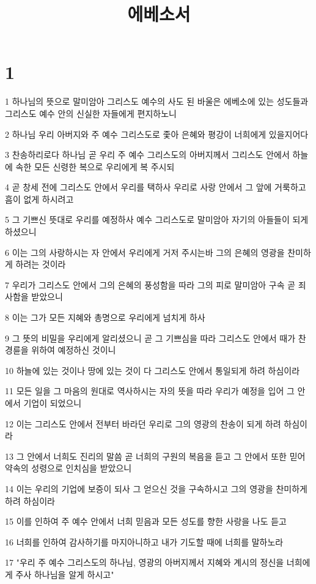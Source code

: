 

\title{에베소서}


\chapter{1}

\par 1 하나님의 뜻으로 말미암아 그리스도 예수의 사도 된 바울은 에베소에 있는 성도들과 그리스도 예수 안의 신실한 자들에게 편지하노니
\par 2 하나님 우리 아버지와 주 예수 그리스도로 좇아 은혜와 평강이 너희에게 있을지어다
\par 3 찬송하리로다 하나님 곧 우리 주 예수 그리스도의 아버지께서 그리스도 안에서 하늘에 속한 모든 신령한 복으로 우리에게 복 주시되
\par 4 곧 창세 전에 그리스도 안에서 우리를 택하사 우리로 사랑 안에서 그 앞에 거룩하고 흠이 없게 하시려고
\par 5 그 기쁘신 뜻대로 우리를 예정하사 예수 그리스도로 말미암아 자기의 아들들이 되게 하셨으니
\par 6 이는 그의 사랑하시는 자 안에서 우리에게 거저 주시는바 그의 은혜의 영광을 찬미하게 하려는 것이라
\par 7 우리가 그리스도 안에서 그의 은혜의 풍성함을 따라 그의 피로 말미암아 구속 곧 죄 사함을 받았으니
\par 8 이는 그가 모든 지혜와 총명으로 우리에게 넘치게 하사
\par 9 그 뜻의 비밀을 우리에게 알리셨으니 곧 그 기쁘심을 따라 그리스도 안에서 때가 찬 경륜을 위하여 예정하신 것이니
\par 10 하늘에 있는 것이나 땅에 있는 것이 다 그리스도 안에서 통일되게 하려 하심이라
\par 11 모든 일을 그 마음의 원대로 역사하시는 자의 뜻을 따라 우리가 예정을 입어 그 안에서 기업이 되었으니
\par 12 이는 그리스도 안에서 전부터 바라던 우리로 그의 영광의 찬송이 되게 하려 하심이라
\par 13 그 안에서 너희도 진리의 말씀 곧 너희의 구원의 복음을 듣고 그 안에서 또한 믿어 약속의 성령으로 인치심을 받았으니
\par 14 이는 우리의 기업에 보증이 되사 그 얻으신 것을 구속하시고 그의 영광을 찬미하게 하려 하심이라
\par 15 이를 인하여 주 예수 안에서 너희 믿음과 모든 성도를 향한 사랑을 나도 듣고
\par 16 너희를 인하여 감사하기를 마지아니하고 내가 기도할 때에 너희를 말하노라
\par 17 "우리 주 예수 그리스도의 하나님, 영광의 아버지께서 지혜와 계시의 정신을 너희에게 주사 하나님을 알게 하시고"
